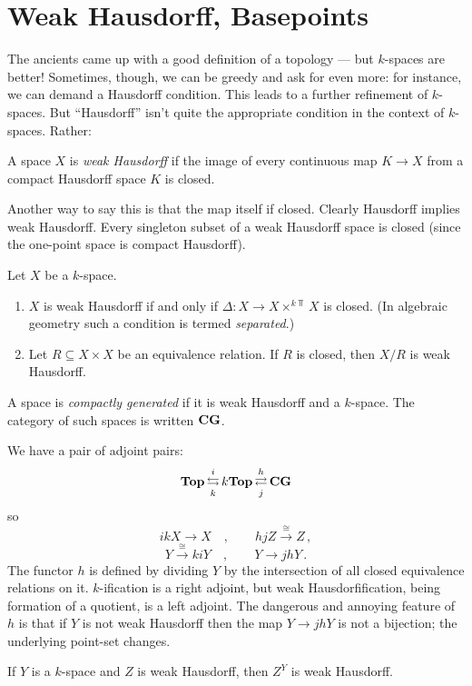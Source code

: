 \section{Weak Hausdorff, Basepoints}\label{basepoints}
The ancients came up with a good definition of a topology ---
but $k$-spaces are better!
Sometimes, though, we can be greedy and ask for even more:
for instance, we can demand a Hausdorff condition.
This leads to a further refinement of $k$-spaces. But ``Hausdorff'' isn't
quite the appropriate condition in the context of $k$-spaces. Rather: 

\begin{definition}
    A space $X$ is {\em weak Hausdorff} if the image of every continuous 
map $K\to X$ from a compact Hausdorff space $K$ is closed.
\end{definition}
Another way to say this is that the map itself if closed. Clearly Hausdorff implies weak Hausdorff. Every singleton subset of a weak Hausdorff space is 
closed (since the one-point space is compact Hausdorff).
\begin{prop}
    Let $X$ be a $k$-space.
    \begin{enumerate}
	\item $X$ is weak Hausdorff if and only if 
$\Delta:X\to X\times^{k\Top}X$ is closed.
(In algebraic geometry such a condition is termed {\em separated}.)
	\item Let $R\subseteq X\times X$ be an equivalence relation. If $R$ is closed, then $X/R$ is weak Hausdorff.
    \end{enumerate}
\end{prop}
\begin{definition}
    A space is {\em compactly generated} if it is weak Hausdorff and a
$k$-space. The category of such spaces is written $\mathbf{CG}$.
\end{definition}
We have a pair of adjoint pairs:
\[
\mathbf{Top}\,\underset{k}{\overset{i}{\operatorname{\leftrightarrows}}}\,k\mathbf{Top}\,
\underset{j}{\overset{h}{\operatorname{\rightleftarrows}}}\,\mathbf{CG}
\]
so 
\[
ikX\to X \quad,\qquad hjZ\xrightarrow{\cong}Z \,,
\]
\[
Y\xrightarrow{\cong}kiY \quad,\qquad Y\to jhY\,.
\]
The functor $h$ is defined by dividing $Y$ by the intersection of all closed
equivalence relations on it. $k$-ification is a right adjoint, but 
weak Hausdorfification, being formation of a quotient, is a left adjoint.
The dangerous and annoying feature of $h$ is that if $Y$ is not weak Hausdorff 
then the map $Y\to jhY$ is not a bijection; the underlying point-set changes. 


\begin{lemma} If $Y$ is a $k$-space and $Z$ is weak Hausdorff, then $Z^Y$ is
weak Hausdorff.
\end{lemma}


